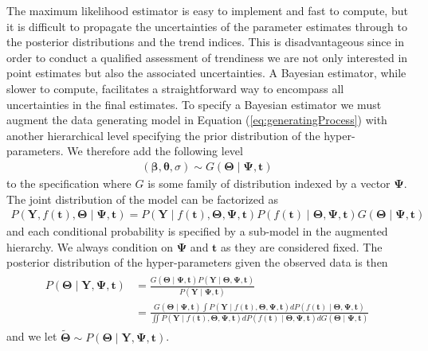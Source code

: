 \documentclass[
  11pt,
]{article}
\theoremstyle{nonumberplain}
\begin{document}
The maximum likelihood estimator is easy to implement and fast to
compute, but it is difficult to propagate the uncertainties of the
parameter estimates through to the posterior distributions and the trend
indices. This is disadvantageous since in order to conduct a qualified
assessment of trendiness we are not only interested in point estimates
but also the associated uncertainties. A Bayesian estimator, while
slower to compute, facilitates a straightforward way to encompass all
uncertainties in the final estimates. To specify a Bayesian estimator we
must augment the data generating model in Equation
(\ref{eq:generatingProcess}) with another hierarchical level specifying
the prior distribution of the hyper-parameters. We therefore add the
following level \begin{align*}
  (\bm{\beta}, \bm{\theta}, \sigma) \sim G(\bm{\Theta} \mid \bm{\Psi}, \mathbf{t})
\end{align*} to the specification where \(G\) is some family of
distribution indexed by a vector \(\bm{\Psi}\). The joint distribution
of the model can be factorized as \begin{align*}
  P(\mathbf{Y}, f(\mathbf{t}), \bm{\Theta} \mid \bm{\Psi}, \mathbf{t}) = P(\mathbf{Y} \mid f(\mathbf{t}), \bm{\Theta}, \bm{\Psi}, \mathbf{t})P(f(\mathbf{t}) \mid \bm{\Theta}, \bm{\Psi}, \mathbf{t})G(\bm{\Theta} \mid \bm{\Psi}, \mathbf{t})
\end{align*} and each conditional probability is specified by a
sub-model in the augmented hierarchy. We always condition on
\(\bm{\Psi}\) and \(\mathbf{t}\) as they are considered fixed. The
posterior distribution of the hyper-parameters given the observed data
is then \begin{align}
\begin{split}
  P(\bm{\Theta} \mid \mathbf{Y}, \bm{\Psi}, \mathbf{t}) & = \frac{G(\bm{\Theta} \mid \bm{\Psi}, \mathbf{t})P(\mathbf{Y} \mid \bm{\Theta}, \bm{\Psi}, \mathbf{t})}{P(\mathbf{Y} \mid \bm{\Psi}, \mathbf{t})}\\
   &= \frac{G(\bm{\Theta} \mid \bm{\Psi}, \mathbf{t}) \int P(\mathbf{Y} \mid f(\mathbf{t}), \bm{\Theta}, \bm{\Psi}, \mathbf{t})dP(f(\mathbf{t}) \mid \bm{\Theta}, \bm{\Psi}, \mathbf{t})}{\iint P(\mathbf{Y} \mid f(\mathbf{t}), \bm{\Theta}, \bm{\Psi}, \mathbf{t})dP(f(\mathbf{t}) \mid \bm{\Theta}, \bm{\Psi}, \mathbf{t})dG(\bm{\Theta} \mid \bm{\Psi}, \mathbf{t})}
\end{split}
\label{eq:posteriorHyper}
\end{align} and we let
\(\widetilde{\bm{\Theta}} \sim P(\bm{\Theta} \mid \mathbf{Y}, \bm{\Psi}, \mathbf{t})\).
\end{document}
